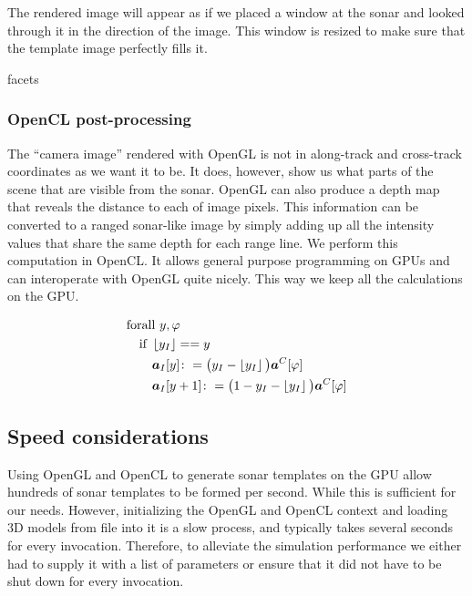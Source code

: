 The rendered image will appear as if we placed a window at the sonar and looked through it in the direction of the image. This window is resized to make sure that the template image perfectly fills it.

facets

\subsubsection{OpenCL post-processing}

The ``camera image'' rendered with OpenGL is not in along-track and cross-track coordinates as we want it to be. It does, however, show us what parts of the scene that are visible from the sonar. OpenGL can also produce a depth map that reveals the distance to each of image pixels. This information can be converted to a ranged sonar-like image by simply adding up all the intensity values that share the same depth for each range line. We perform this computation in OpenCL. It allows general purpose programming on GPUs and can interoperate with OpenGL quite nicely. This way we keep all the calculations on the GPU.

\begin{align}
&\text{forall } y,\varphi \nonumber\\
&\quad\text{if }\left\lfloor y_I\right\rfloor == y \nonumber\\
&\qquad\boldsymbol{a}_I[y] \colon= \big(y_I - \left\lfloor y_I\right\rfloor\big)\boldsymbol{a}^C[\varphi] \nonumber\\
&\qquad\boldsymbol{a}_I[y+1] \colon= \big(1 - y_I - \left\lfloor y_I\right\rfloor\big)\boldsymbol{a}^C[\varphi]
\end{align}


\subsection{Speed considerations}

Using OpenGL and OpenCL to generate sonar templates on the GPU allow hundreds of sonar templates to be formed per second. While this is sufficient for our needs. However, initializing the OpenGL and OpenCL context and loading 3D models from file into it is a slow process, and typically takes several seconds for every invocation. Therefore, to alleviate the simulation performance we either had to supply it with a list of parameters or ensure that it did not have to be shut down for every invocation. 

